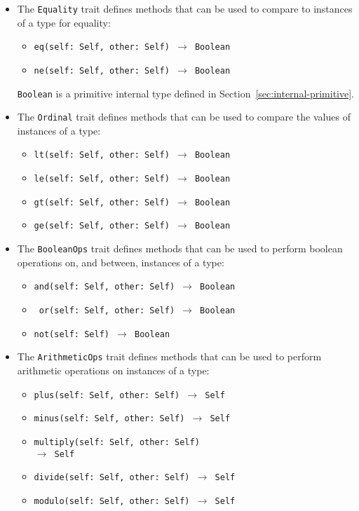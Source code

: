 \documentclass[10pt,twocolumn,a4paper]{article}
\newcommand{\code}[1]{\texttt{#1}}
\begin{document}
\begin{itemize}
  \item The \code{Equality} trait defines methods that can be used to
    compare to instances of a type for equality:
    \begin{itemize}
      \item \texttt{eq(self: Self, other: Self) $\rightarrow$ Boolean}
      \item \texttt{ne(self: Self, other: Self) $\rightarrow$ Boolean}
    \end{itemize}
    \code{Boolean} is a primitive internal type defined in
    Section~\ref{sec:internal-primitive}.

  \item The \code{Ordinal} trait defines methods that can be used to
    compare the values of instances of a type:
    \begin{itemize}
      \item \texttt{lt(self: Self, other: Self) $\rightarrow$ Boolean}
      \item \texttt{le(self: Self, other: Self) $\rightarrow$ Boolean}
      \item \texttt{gt(self: Self, other: Self) $\rightarrow$ Boolean}
      \item \texttt{ge(self: Self, other: Self) $\rightarrow$ Boolean}
    \end{itemize}

  \item The \code{BooleanOps} trait defines methods that can be used to
    perform boolean operations on, and between, instances of a type:
    \begin{itemize}
      \item \texttt{and(self: Self, other: Self) $\rightarrow$ Boolean}
      \item \texttt{ or(self: Self, other: Self) $\rightarrow$ Boolean}
      \item \texttt{not(self: Self) $\rightarrow$ Boolean}
    \end{itemize}

  \item The \code{ArithmeticOps} trait defines methods that can be used to
    perform arithmetic operations on instances of a type:
    \begin{itemize}
      \item \texttt{plus(self: Self, other: Self) $\rightarrow$ Self}
      \item \texttt{minus(self: Self, other: Self) $\rightarrow$ Self}
      \item \texttt{multiply(self: Self, other: Self)\\\hspace*{0.5cm}$\rightarrow$ Self}
      \item \texttt{divide(self: Self, other: Self) $\rightarrow$ Self}
      \item \texttt{modulo(self: Self, other: Self) $\rightarrow$ Self}
    \end{itemize}


\end{itemize}
\end{document}
